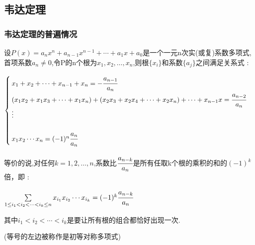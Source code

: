 \documentclass[UTF8,12pt]{ctexbook}
\newcommand{\tikzPlaceDot}[1]{\draw[fill = black] #1 circle (1pt)}
\begin{document}
{{{  

}%

\subsection{韦达定理}{
\subsubsection{韦达定理的普遍情况}{
设$P(x) = a_nx^n + a_{n-1}x^{n-1} + \dotsm + a_1x + a_0$是一个一元n次实(或复)系数多项式,首项系数$a_n \neq 0$,令P的n个根为$x_1,x_2,\dots,x_n$,则根$\{x_i\}$和系数$\{a_j\}$之间满足关系式 :

$$
  \begin{cases}
    x_1 + x_2 + \dotsm + x_{n-1} + x_n = -\cfrac{a_{n-1}}{a_n}                                                           \\
    (x_1x_2 + x_1x_3 + \dotsm + x_1x_n) + (x_2x_3 + x_2x_4 + \dotsm + x_2x_n) + \dotsm + x_{n-1}x = \cfrac{a_{n-2}}{a_n} \\
    \vdots                                                                                                               \\                                                                                                               \\
    x_1x_2 \dotsm x_n = (-1)^n\cfrac{a_n}{a_n}
  \end{cases}
$$

等价的说,对任何$k = 1,2,\dots,n$,系数比$\cfrac{a_{n-k}}{a_n}$是所有任取k个根的乘积的和的$(-1)^k$倍，即 :

$\sum\limits_{1 \leq i_1 < i_2 < \dotsm < i_k \leq n}x_{i_{1}}x_{i_{2}} \dotsm x_{i_{k}} = (-1)^k\cfrac{a_{n-k}}{a_n}$

其中$i_1 < i_2 < \dotsm < i_k$是要让所有根的组合都恰好出现一次.

(等号的左边被称作是初等对称多项式)
}%

}}}
\end{document}
